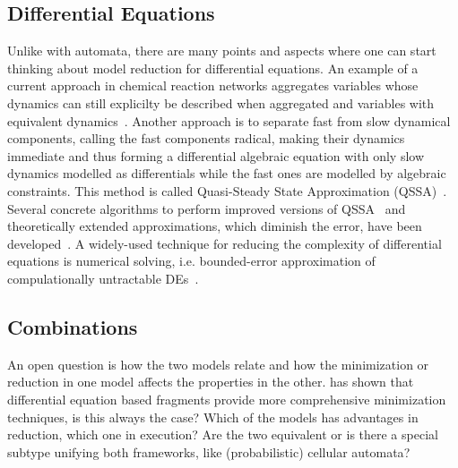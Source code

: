 \documentclass[11pt, rgb]{scrartcl}
\begin{document}
\subsection{Differential Equations}
Unlike with automata, there are many points and aspects where one can start thinking about model reduction for differential equations. 
An example of a current approach in chemical reaction networks aggregates variables whose dynamics can still explicilty be described when aggregated and variables with equivalent dynamics~\autocite{Cardelli2017MaximalAO}.
Another approach is to separate fast from slow dynamical components, calling the fast components radical, making their dynamics immediate and thus forming a differential algebraic equation with only slow dynamics modelled as differentials while the fast ones are modelled by algebraic constraints. 
This method is called Quasi-Steady State Approximation (QSSA)~\autocite{briggs1925note}.
Several concrete algorithms to perform improved versions of QSSA~\autocite{boulier2009towards} and theoretically extended approximations, which diminish the error, have been developed~\autocite{deuflhard1996dynamic}.
A widely-used technique for reducing the complexity of differential equations is numerical solving, i.e. bounded-error approximation of compulationally untractable DEs~\autocite{curtiss1952integration, kutta1901beitrag, orszag1969numerical}. 


\subsection{Combinations}
An open question is how the two models relate and how the minimization or reduction in one model affects the properties in the other. 
\autocite{mc_agg_crn} has shown that differential equation based fragments provide more comprehensive minimization techniques, is this always the case? 
Which of the models has advantages in reduction, which one in execution?
Are the two equivalent or is there a special subtype unifying both frameworks, like (probabilistic) cellular automata\autocite{von1966theory, olariu2005cellular, grinstein1985statistical}?

\printbibliography

\appendix
\end{document}
